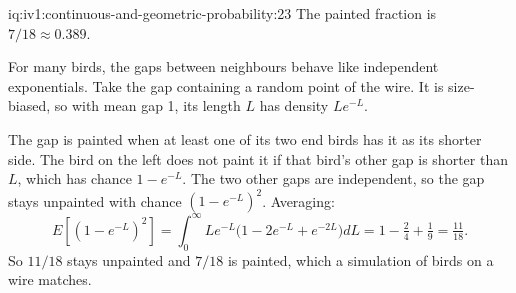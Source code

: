 \begin{solution}{iq:iv1:continuous-and-geometric-probability:23}
The painted fraction is $7/18 \approx 0.389$.

For many birds, the gaps between neighbours behave like independent exponentials. Take the gap containing a random point of the wire. It is size-biased, so with mean gap 1, its length $L$ has density $Le^{-L}$.

The gap is painted when at least one of its two end birds has it as its shorter side. The bird on the left does not paint it if that bird's other gap is shorter than $L$, which has chance $1 - e^{-L}$. The two other gaps are independent, so the gap stays unpainted with chance $(1 - e^{-L})^2$. Averaging:
\[
E[(1 - e^{-L})^2] = \int_0^\infty Le^{-L}\bigl(1 - 2e^{-L} + e^{-2L}\bigr) dL = 1 - \tfrac24 + \tfrac19 = \tfrac{11}{18}.
\]
So $11/18$ stays unpainted and $7/18$ is painted, which a simulation of birds on a wire matches.

\end{solution}

